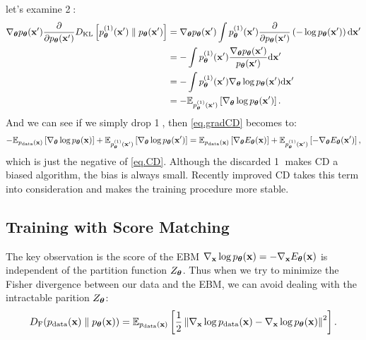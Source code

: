 \documentclass{article}
\begin{document}
let's examine \textcircled{2}:
\begin{equation}
    \begin{aligned}
        \nabla_{\bm{\theta}} p_{\bm{\theta}}({\mathbf{x}}')\frac{\partial}{\partial p_{\bm{\theta}}({\mathbf{x}}')}D_{\mathrm{KL}}\left[ p^{(1)}_{{\bm{\theta}}}({\mathbf{x}}') \parallel p_{\bm{\theta}}({\mathbf{x}}')\right]
        &= \nabla_{\bm{\theta}} p_{\bm{\theta}}({\mathbf{x}}')\int p^{(1)}_{{\bm{\theta}}}({\mathbf{x}}')\frac{\partial}{\partial p_{\bm{\theta}}({\mathbf{x}}')}\left( -\log p_{\bm{\theta}}({\mathbf{x}}') \right)\mathrm{d}{\mathbf{x}}' \\
        &= -\int p^{(1)}_{{\bm{\theta}}}({\mathbf{x}}')\frac{\nabla_{\bm{\theta}} p_{\bm{\theta}}({\mathbf{x}}')}{p_{\bm{\theta}}({\mathbf{x}}')}\mathrm{d}{\mathbf{x}}' \\
        &= -\int p^{(1)}_{{\bm{\theta}}}({\mathbf{x}}') \nabla_{\bm{\theta}}\log p_{\bm{\theta}}({\mathbf{x}}')\mathrm{d}{\mathbf{x}}' \\
        &= -\mathbb{E}_{p^{(1)}_{{\bm{\theta}}}({\mathbf{x}}')}\left[ \nabla_{\bm{\theta}}\log p_{\bm{\theta}}({\mathbf{x}}') \right].
    \end{aligned}
\end{equation}
And we can see if we simply drop \textcircled{1}, then \eqref{eq.gradCD} becomes to:
\begin{equation}
        -\mathbb{E}_{p_{\rm{data}}({\mathbf{x}})}\left[ \nabla_{\bm{\theta}}\log p_{\bm{\theta}}({\mathbf{x}}) \right] + \mathbb{E}_{p^{(1)}_{{\bm{\theta}}}({\mathbf{x}}')}\left[ \nabla_{\bm{\theta}}\log p_{\bm{\theta}}({\mathbf{x}}') \right] = \mathbb{E}_{p_{\rm{data}}({\mathbf{x}})}\left[ \nabla_{\bm{\theta}} E_{\bm{\theta}}({\mathbf{x}}) \right] + \mathbb{E}_{p^{(1)}_{{\bm{\theta}}}({\mathbf{x}}')}\left[ -\nabla_{\bm{\theta}} E_{\bm{\theta}}({\mathbf{x}}') \right],
\end{equation}
which is just the negative of \eqref{eq.CD}. Although the discarded \textcircled{1} makes CD a biased algorithm, the bias is always small. Recently improved CD \citep{improvedCD} takes this term into consideration and makes the training procedure more stable.


\subsection{Training with Score Matching}
The key observation is the score of the EBM $\nabla_{{\mathbf{x}}}\log p_{\bm{\theta}}({\mathbf{x}}) = -\nabla_{{\mathbf{x}}}E_{\bm{\theta}}({\mathbf{x}})$ is independent of the partition function $Z_{\bm{\theta}}$. Thus when we try to minimize the Fisher divergence between our data and the EBM, we can avoid dealing with the intractable parition $Z_{\bm{\theta}}$:
\begin{equation}
    D_{\mathrm{F}}(p_{\rm{data}}({\mathbf{x}}) \parallel p_{\bm{\theta}}({\mathbf{x}})) = \mathbb{E}_{p_{\rm{data}}({\mathbf{x}})}\left[ \frac{1}{2}\left\|\nabla_{\mathbf{x}} \log p_{\rm{data}}(\mathbf{x})-\nabla_{\mathbf{x}} \log p_{\boldsymbol{\theta}}(\mathbf{x})\right\|^2 \right].
\end{equation}
\end{document}

